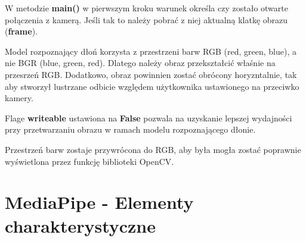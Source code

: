 


\quad W metodzie \textbf{main()} w pierwszym kroku warunek określa czy zostało otwarte połączenia z kamerą. Jeśli tak to należy pobrać z niej aktualną klatkę obrazu (\textbf{frame}). \newline



\quad Model rozpoznający dłoń korzysta z przestrzeni barw RGB (red, green, blue), a nie BGR (blue, green, red). Dlatego należy obraz przekształcić właśnie na przesrzeń RGB. Dodatkowo, obraz powinnien zostać obrócony horyzntalnie, tak aby stworzył lustrzane odbicie względem użytkownika ustawionego na przeciwko kamery. \newline



\quad Flage \textbf{writeable} ustawiona na \textbf{False} pozwala na uzyskanie lepszej wydajności przy przetwarzaniu obrazu w ramach modelu rozpoznającego dłonie.\newline 



\quad Przestrzeń barw zostaje przywrócona do RGB, aby była mogła zostać poprawnie wyświetlona przez funkcję biblioteki OpenCV. \newline





\section{MediaPipe - Elementy charakterystyczne}


